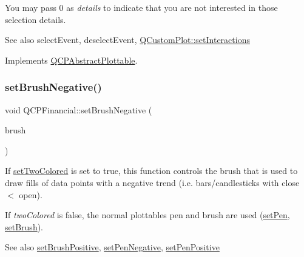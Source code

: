 You may pass 0 as {\itshape details} to indicate that you are not interested in those selection details.

\begin{DoxySeeAlso}{See also}
select\+Event, deselect\+Event, \hyperlink{class_q_custom_plot_a5ee1e2f6ae27419deca53e75907c27e5}{Q\+Custom\+Plot\+::set\+Interactions} 
\end{DoxySeeAlso}


Implements \hyperlink{class_q_c_p_abstract_plottable_a38efe9641d972992a3d44204bc80ec1d}{Q\+C\+P\+Abstract\+Plottable}.

\hypertarget{class_q_c_p_financial_a8bbdd87629f9144b3ef51af660c0961a}{}\label{class_q_c_p_financial_a8bbdd87629f9144b3ef51af660c0961a} 
\subsubsection{\texorpdfstring{set\+Brush\+Negative()}{setBrushNegative()}}
{\footnotesize\ttfamily void Q\+C\+P\+Financial\+::set\+Brush\+Negative (\begin{DoxyParamCaption}\item[{const Q\+Brush \&}]{brush }\end{DoxyParamCaption})}

If \hyperlink{class_q_c_p_financial_a138e44aac160a17a9676652e240c5f08}{set\+Two\+Colored} is set to true, this function controls the brush that is used to draw fills of data points with a negative trend (i.\+e. bars/candlesticks with close $<$ open).

If {\itshape two\+Colored} is false, the normal plottable\textquotesingle{}s pen and brush are used (\hyperlink{class_q_c_p_abstract_plottable_ab74b09ae4c0e7e13142fe4b5bf46cac7}{set\+Pen}, \hyperlink{class_q_c_p_abstract_plottable_a7a4b92144dca6453a1f0f210e27edc74}{set\+Brush}).

\begin{DoxySeeAlso}{See also}
\hyperlink{class_q_c_p_financial_a5ebff2b1764efd07cc44942e67821829}{set\+Brush\+Positive}, \hyperlink{class_q_c_p_financial_afe5c07e94ccea01a75b3a2476993c346}{set\+Pen\+Negative}, \hyperlink{class_q_c_p_financial_ac58aa3adc7a35aab0088764b840683e5}{set\+Pen\+Positive} 
\end{DoxySeeAlso}
\hypertarget{class_q_c_p_financial_a5ebff2b1764efd07cc44942e67821829}{}\label{class_q_c_p_financial_a5ebff2b1764efd07cc44942e67821829} 
